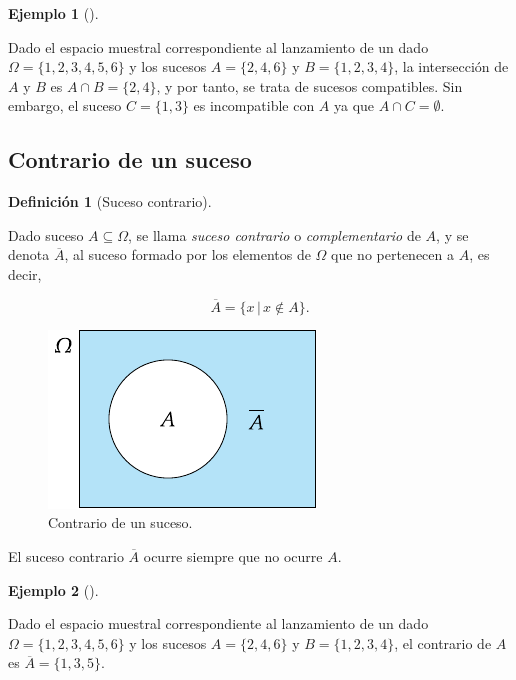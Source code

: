 \documentclass[
  a4paper,
]{scrreport}
\theoremstyle{plain}
\theoremstyle{definition}
\newtheorem{example}{Ejemplo}[chapter]
\theoremstyle{definition}
\newtheorem{definition}{Definición}[chapter]
\theoremstyle{remark}
\begin{document}
\begin{example}[]\protect\hypertarget{exm-interseccion-sucesos}{}\label{exm-interseccion-sucesos}

Dado el espacio muestral correspondiente al lanzamiento de un dado
\(\Omega=\{1,2,3,4,5,6\}\) y los sucesos \(A=\{2,4,6\}\) y
\(B=\{1,2,3,4\}\), la intersección de \(A\) y \(B\) es
\(A\cap B=\{2,4\}\), y por tanto, se trata de sucesos compatibles. Sin
embargo, el suceso \(C=\{1, 3\}\) es incompatible con \(A\) ya que
\(A\cap C=\emptyset\).

\end{example}

\subsection{Contrario de un suceso}\label{contrario-de-un-suceso}

\begin{definition}[Suceso
contrario]\protect\hypertarget{def-contrario-suceso}{}\label{def-contrario-suceso}

Dado suceso \(A\subseteq \Omega\), se llama \emph{suceso contrario} o
\emph{complementario} de \(A\), y se denota \(\overline A\), al suceso
formado por los elementos de \(\Omega\) que no pertenecen a \(A\), es
decir,

\[\overline A = \{x\,|\, x\not\in A\}.\]

\end{definition}

\begin{figure}[H]

{\centering \includegraphics{img/probabilidad/contrario.pdf}

}

\caption{Contrario de un suceso.}

\end{figure}%

El suceso contrario \(\overline A\) ocurre siempre que {no} ocurre
\(A\).

\begin{example}[]\protect\hypertarget{exm-contrario-suceso}{}\label{exm-contrario-suceso}

Dado el espacio muestral correspondiente al lanzamiento de un dado
\(\Omega=\{1,2,3,4,5,6\}\) y los sucesos \(A=\{2,4,6\}\) y
\(B=\{1,2,3,4\}\), el contrario de \(A\) es \(\overline A=\{1,3,5\}\).

\end{example}
\end{document}
